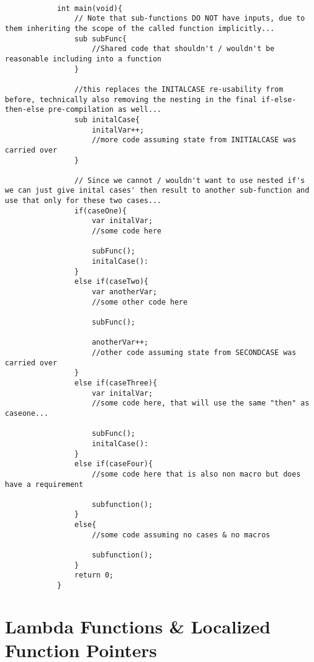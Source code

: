 \documentclass{article}
\begin{document}
    \begin{lstlisting}
            
            int main(void){
                // Note that sub-functions DO NOT have inputs, due to them inheriting the scope of the called function implicitly...
                sub subFunc{
                    //Shared code that shouldn't / wouldn't be reasonable including into a function
                }
                
                //this replaces the INITALCASE re-usability from before, technically also removing the nesting in the final if-else-then-else pre-compilation as well...
                sub initalCase{
                    initalVar++;
                    //more code assuming state from INITIALCASE was carried over
                }

                // Since we cannot / wouldn't want to use nested if's we can just give inital cases' then result to another sub-function and use that only for these two cases...
                if(caseOne){
                    var initalVar;
                    //some code here

                    subFunc();
                    initalCase():
                }
                else if(caseTwo){
                    var anotherVar;
                    //some other code here
    
                    subFunc();
    
                    anotherVar++;
                    //other code assuming state from SECONDCASE was carried over
                }
                else if(caseThree){
                    var initalVar;
                    //some code here, that will use the same "then" as caseone...

                    subFunc();
                    initalCase():
                }
                else if(caseFour){
                    //some code here that is also non macro but does have a requirement

                    subfunction();
                }
                else{
                    //some code assuming no cases & no macros

                    subfunction();
                }
                return 0;
            }
    \end{lstlisting}

    \newpage
    \section{Lambda Functions \& Localized Function Pointers}
    
\end{document}
